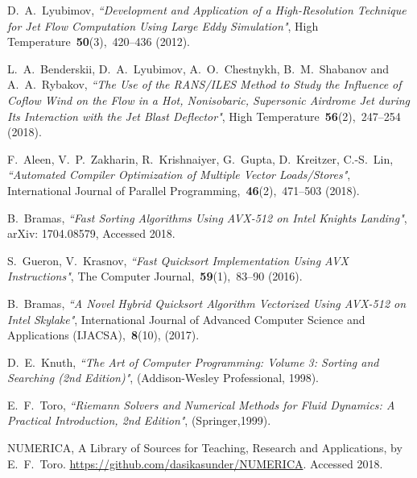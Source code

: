 \documentclass[
11pt,%
tightenlines,%
twoside,%
onecolumn,%
nofloats,%
nobibnotes,%
nofootinbib,%
superscriptaddress,%
noshowpacs,%
centertags]%
{revtex4}
\begin{document}
\begin{thebibliography}{99}
D.~A.~Lyubimov, {\it ``Development and Application of a High-Resolution Technique for Jet Flow Computation Using Large Eddy Simulation"}, High Temperature~{\bf 50}(3),~420--436 (2012).

L.~A.~Benderskii, D.~A.~Lyubimov, A.~O.~Chestnykh, B.~M.~Shabanov and A.~A.~Rybakov, {\it ``The Use of the RANS/ILES Method to Study the Influence of Coflow Wind on the Flow in a Hot, Nonisobaric, Supersonic Airdrome Jet during Its Interaction with the Jet Blast Deflector"}, High Temperature~{\bf 56}(2),~247--254 (2018).

F.~Aleen, V.~P.~Zakharin, R.~Krishnaiyer, G.~Gupta, D.~Kreitzer, C.-S.~Lin, {\it ``Automated Compiler Optimization of Multiple Vector Loads/Stores"}, International Journal of Parallel Programming,~{\bf 46}(2),~471--503 (2018).


B.~Bramas, {\it ``Fast Sorting Algorithms Using AVX-512 on Intel Knights Landing"}, arXiv: 1704.08579, Accessed 2018.

S.~Gueron, V.~Krasnov, {\it ``Fast Quicksort Implementation Using AVX Instructions"}, The Computer Journal,~{\bf 59}(1),~83--90 (2016).

B.~Bramas, {\it ``A Novel Hybrid Quicksort Algorithm Vectorized Using AVX-512 on Intel Skylake"}, International Journal of Advanced Computer Science and Applications (IJACSA),~{\bf 8}(10), (2017).

D.~E.~Knuth, {\it ``The Art of Computer Programming: Volume 3: Sorting and Searching (2nd Edition)"}, (Addison-Wesley Professional, 1998).


E.~F.~Toro, {\it ``Riemann Solvers and Numerical Methods for Fluid Dynamics:
A Practical Introduction, 2nd Edition"}, (Springer,1999).

NUMERICA, A Library of Sources for Teaching, Research and Applications, by E.~F.~Toro. \url{https://github.com/dasikasunder/NUMERICA}. Accessed 2018.

\end{thebibliography}
\end{document}
